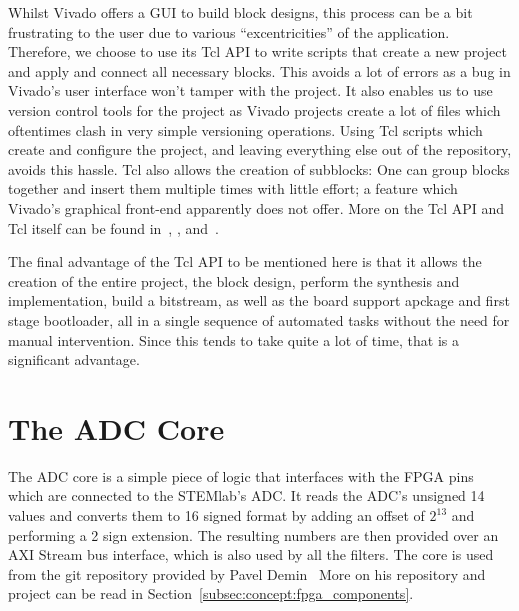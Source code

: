 Whilst Vivado offers  a GUI to build  block designs, this process can be a bit
frustrating to the user due to various ``excentricities'' of the application.
Therefore, we choose to use its Tcl API
to write scripts that create a new project and apply and connect all necessary
blocks. This avoids a lot of errors as  a bug in Vivado's user interface won't tamper
with the project.
It  also enables  us  to use  version control tools for  the  project as  Vivado
projects  create  a  lot  of  files which  oftentimes  clash  in  very  simple
versioning operations. Using Tcl scripts which create and configure the project,
and leaving everything else out of the repository, avoids this hassle.
Tcl also allows  the creation of subblocks: One can group  blocks together and
insert  them multiple  times  with  little effort;  a  feature which  Vivado's
graphical front-end apparently does not offer.
More    on    the    Tcl    API     and    Tcl    itself    can    be    found
in~\cite{xilinx:vivado-tcl-command-reference-guide},
\cite{xilinx:vivado-design-suit-user-guide:using-tcl-scripting},
and~\cite{tcl-exchange}.

The final advantage of the Tcl API to  be mentioned here is that it allows the
creation of  the entire project, the  block design, perform the  synthesis and
implementation, build  a bitstream, as well  as the board support  apckage and
first stage  bootloader, all in a  single sequence of automated  tasks without
the need  for manual  intervention. Since this  tends to take  quite a  lot of
time, that is a significant advantage.

%
%
\section{The ADC Core} %
\label{sec:fpga:adc}

The ADC  core is a simple  piece of logic  that interfaces with the  FPGA pins
which  are  connected  to  the  STEMlab's ADC. It  reads  the  ADC's  unsigned
\SI{14}{\bit}  values and  converts  them to  \SI{16}{\bit}  signed format  by
adding an offset of $2^{13}$ and performing a \SI{2}{\bit} sign extension. The
resulting numbers are then provided over an AXI Stream bus interface, which is
also  used by  all the  filters.  The  core is  used from  the git  repository
provided by Pavel Demin~\cite{pita:github:pitaya-notes} More on his repository
and project can be read in Section~\ref{subsec:concept:fpga_components}.

